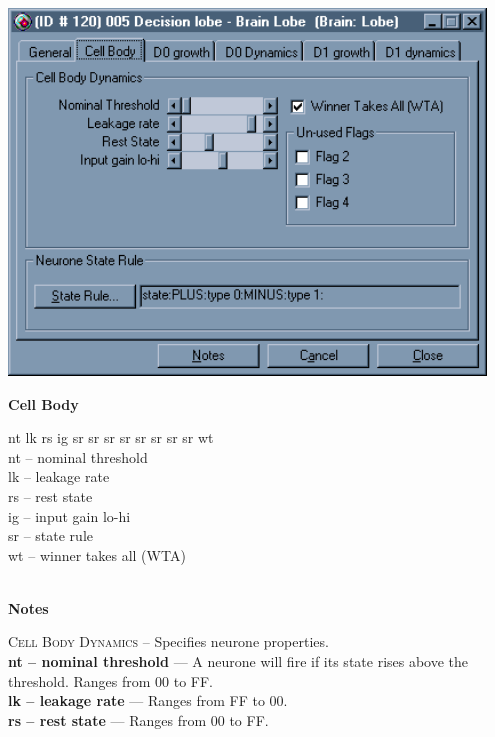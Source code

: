 \documentclass[11pt,twoside,a4paper]{article}
\begin{document}
\begin{minipage}[ht]{0.40\textwidth}
	\includegraphics[width=0.95\textwidth]{img/gen00k2.png}
\end{minipage} \hfill \begin{minipage}[ht]{0.575\textwidth}
	\textbf{\large Cell Body} %

	nt lk rs ig sr sr sr sr sr sr sr sr wt ~\\

	nt -- nominal threshold ~\\
	lk -- leakage rate ~\\
	rs -- rest state ~\\
	ig -- input gain lo-hi ~\\
	sr -- state rule ~\\
	wt -- winner takes all (WTA) ~\\
\end{minipage} ~\\

\textbf{\large Notes}

\textsc{Cell Body Dynamics} -- Specifies neurone properties. ~\\

\textbf{nt -- nominal threshold} --- A neurone will fire if its state rises above the threshold. Ranges from 00 to FF. ~\\

\textbf{lk -- leakage rate} --- Ranges from FF to 00. ~\\

\textbf{rs -- rest state} --- Ranges from 00 to FF. ~\\
\end{document}

